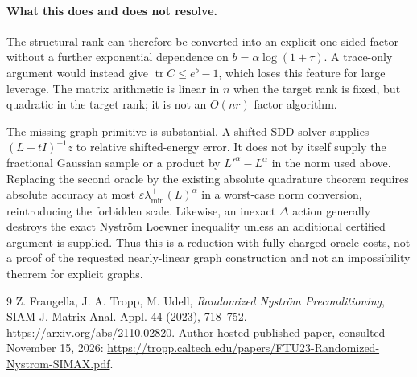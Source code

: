 \documentclass[11pt]{article}
\newcommand{\tr}{\operatorname{tr}}
\begin{document}
\paragraph{What this does and does not resolve.}
The structural rank can therefore be converted into an explicit
one-sided factor without a further exponential dependence on
$b=\alpha\log(1+\tau)$.  A trace-only argument would instead give
$\tr C\le e^b-1$, which loses this feature for large leverage.
The matrix arithmetic is linear in $n$ when the target rank is fixed,
but quadratic in the target rank; it is not an $O(nr)$ factor algorithm.

The missing graph primitive is substantial.  A shifted SDD solver
supplies $(L+tI)^{-1}z$ to relative shifted-energy error.  It does not
by itself supply the fractional Gaussian sample or a product by
$L'^\alpha-L^\alpha$ in the norm used above.  Replacing the second
oracle by the existing absolute quadrature theorem requires absolute
accuracy at most $\varepsilon\lambda_{\min}^+(L)^\alpha$ in a
worst-case norm conversion, reintroducing the forbidden scale.
Likewise, an inexact $\Delta$ action generally destroys the exact
Nystr\"om Loewner inequality unless an additional certified argument
is supplied.  Thus this is a reduction with fully charged oracle
costs, not a proof of the requested nearly-linear graph construction
and not an impossibility theorem for explicit graphs.

\begin{thebibliography}{9}
 Z. Frangella, J. A. Tropp, M. Udell,
\emph{Randomized Nystr\"om Preconditioning},
SIAM J. Matrix Anal. Appl. 44 (2023), 718--752.
\url{https://arxiv.org/abs/2110.02820}.
Author-hosted published paper, consulted November 15, 2026:
\url{https://tropp.caltech.edu/papers/FTU23-Randomized-Nystrom-SIMAX.pdf}.
\end{thebibliography}
\end{document}
